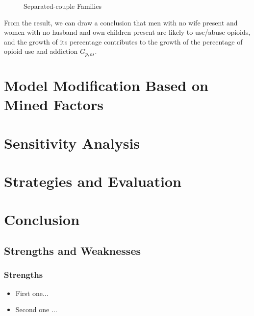 \documentclass[12pt]{article}
\begin{document}
\begin{figure}[h]
\centering
{}
\caption{Separated-couple Families}
\end{figure}

From the result, we can draw a conclusion that men with no wife present and women with no husband and own children present are likely to use/abuse opioids, and the growth of its percentage contributes to the growth of the percentage of opioid use and addiction $G_{p,os}$.

\section{Model Modification Based on Mined Factors}


\section{Sensitivity Analysis}


\section{Strategies and Evaluation}


\section{Conclusion}
\subsection{Strengths and Weaknesses}
\subsubsection{Strengths}
\begin{itemize}
    \item First one...
    \item Second one ...
\end{itemize}
\end{document}
